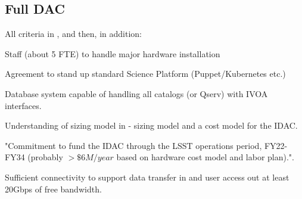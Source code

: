 \subsection{Full DAC} \label{sec:fullDAC}
All criteria in , and then, in addition:
\begin{todolist}
\item Staff (about 5 FTE) to handle major hardware installation
\item Agreement to stand up standard Science Platform (Puppet/Kubernetes etc.)
\item Database system capable of handling all catalogs (or Qserv) with IVOA  interfaces.
\item Understanding of sizing model in  - sizing model and a cost model for the IDAC.
\item "Commitment to fund the IDAC through the LSST operations period, FY22-FY34 (probably  $>\$6M/year$ based on hardware cost model and labor plan).".
\item Sufficient connectivity to support data transfer in and user access out at least 20Gbps of free bandwidth.
\end{todolist}
